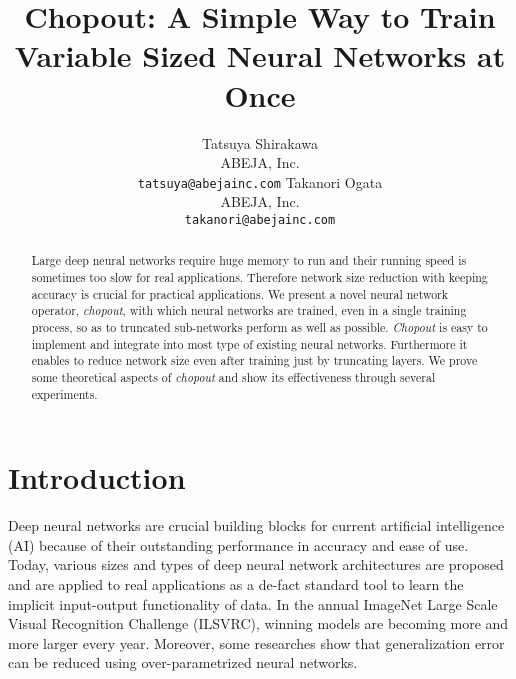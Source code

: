 \documentclass{article}
\title{Chopout: A Simple Way to Train Variable Sized Neural Networks at Once}
\author{
      Tatsuya Shirakawa \\
      ABEJA, Inc. \\
      \texttt{tatsuya@abejainc.com}
      \And
      Takanori Ogata \\
      ABEJA, Inc. \\
      \texttt{takanori@abejainc.com}
    }
\begin{document}
    
    \maketitle
    
    \begin{abstract}
      Large deep neural networks require huge memory to run and their running speed is sometimes too slow for real applications. Therefore network size reduction with keeping accuracy is crucial for practical applications. We present a novel neural network operator, \textit{chopout}, with which neural networks are trained, even in a single training process, so as to truncated sub-networks perform as well as possible. \textit{Chopout} is easy to implement and integrate into most type of existing neural networks. Furthermore it enables to reduce network size even after training just by truncating layers. We prove some theoretical aspects of \textit{chopout} and show its effectiveness through several experiments.
    \end{abstract}
    
    \section{Introduction}
    
    
    Deep neural networks are crucial building blocks for current artificial intelligence (AI)  because of their outstanding performance in accuracy and ease of use.
    Today, various sizes and types of deep neural network architectures are proposed and are applied to real applications as a de-fact standard tool to learn the implicit input-output functionality of data.
    In the annual ImageNet Large Scale Visual Recognition Challenge (ILSVRC), winning models are becoming more and more larger every year. 
    Moreover, some researches show that generalization error can be reduced using over-parametrized neural networks.
\end{document}
